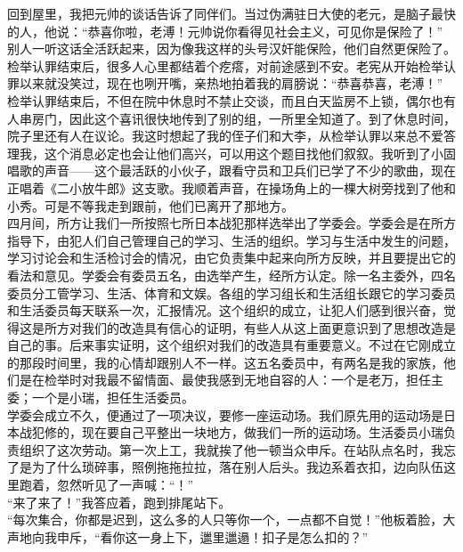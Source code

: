 回到屋里，我把元帅的谈话告诉了同伴们。当过伪满驻日大使的老元，是脑子最快的人，他说：“恭喜你啦，老溥！元帅说你看得见社会主义，可见你是保险了！”\\

别人一听这话全活跃起来，因为像我这样的头号汉奸能保险，他们自然更保险了。\\

检举认罪结束后，很多人心里都结着个疙瘩，对前途感到不安。老宪从开始检举认罪以来就没笑过，现在也咧开嘴，亲热地拍着我的肩膀说：“恭喜恭喜，老溥！”\\

检举认罪结束后，不但在院中休息时不禁止交谈，而且白天监房不上锁，偶尔也有人串房门，因此这个喜讯很快地传到了别的组，一所里全知道了。到了休息时间，院子里还有人在议论。我这时想起了我的侄子们和大李，从检举认罪以来总不爱答理我，这个消息必定也会让他们高兴，可以用这个题目找他们叙叙。我听到了小固唱歌的声音——这个最活跃的小伙子，跟看守员和卫兵们已学了不少的歌曲，现在正唱着《二小放牛郎》这支歌。我顺着声音，在操场角上的一棵大树旁找到了他和小秀。可是不等我走到跟前，他们已离开了那地方。\\

四月间，所方让我们一所按照七所日本战犯那样选举出了学委会。学委会是在所方指导下，由犯人们自己管理自己的学习、生活的组织。学习与生活中发生的问题，学习讨论会和生活检讨会的情况，由它负责集中起来向所方反映，并且要提出它的看法和意见。学委会有委员五名，由选举产生，经所方认定。除一名主委外，四名委员分工管学习、生活、体育和文娱。各组的学习组长和生活组长跟它的学习委员和生活委员每天联系一次，汇报情况。这个组织的成立，让犯人们感到很兴奋，觉得这是所方对我们的改造具有信心的证明，有些人从这上面更意识到了思想改造是自己的事。后来事实证明，这个组织对我们的改造具有重要意义。不过在它刚成立的那段时间里，我的心情却跟别人不一样。这五名委员中，有两名是我的家族，他们是在检举时对我最不留情面、最使我感到无地自容的人：一个是老万，担任主委；一个是小瑞，担任生活委员。\\

学委会成立不久，便通过了一项决议，要修一座运动场。我们原先用的运动场是日本战犯修的，现在要自己平整出一块地方，做我们一所的运动场。生活委员小瑞负责组织了这次劳动。第一次上工，我就挨了他一顿当众申斥。在站队点名时，我忘了是为了什么琐碎事，照例拖拖拉拉，落在别人后头。我边系着衣扣，边向队伍这里跑着，忽然听见了一声喊：“！”\\

“来了来了！”我答应着，跑到排尾站下。\\

“每次集合，你都是迟到，这么多的人只等你一个，一点都不自觉！”他板着脸，大声地向我申斥，“看你这一身上下，邋里邋遢！扣子是怎么扣的？”\\

